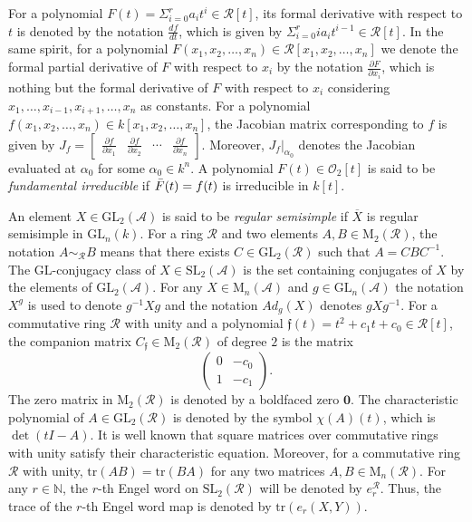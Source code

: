 \documentclass[10pt,twoside]{amsart}
\newcommand{\GL}{\mathrm{GL}}
\newcommand{\SL}{\mathrm{SL}}
\newcommand{\tr}{\mathrm{tr}}
\newcommand{\M}{\mathrm{M}}
\newcommand{\R}{\mathcal{O}_2}
\theoremstyle{definition}
\theoremstyle{definition}
\begin{document}
For a polynomial $F(t) = \Sigma_{i=0}^r a_i t^i\in \mathcal R[t]$, its formal derivative with respect to $t$ is denoted by the notation $\frac{df}{dt}$, which is given by $\Sigma_{i=0}^r ia_i t^{i-1}\in \mathcal R[t]$. In the same spirit, for a polynomial $F(x_1,x_2,\ldots, x_n)\in \mathcal R[x_1,x_2,\ldots,x_n]$ we denote the formal partial derivative of $F$ with respect to $x_i$ by the notation $\frac{\partial F}{\partial x_i}$, which is nothing but the formal derivative of $F$ with respect to $x_i$ considering $x_1,\ldots, x_{i-1}, x_{i+1},\ldots, x_n$ as constants. For a polynomial $f(x_1,x_2,\ldots, x_n)\in k[x_1,x_2,\ldots, x_n]$, the Jacobian matrix corresponding to $f$ is given by $J_f = \left[\begin{array}{cccccccc}
\frac{\partial f}{\partial x_1} & \frac{\partial f}{\partial x_2} & \cdots & \frac{\partial f}{\partial x_n} 
\end{array}\right]$. Moreover, $J_f|_{\alpha_0}$
 denotes the Jacobian evaluated at $\alpha_0$ for some $\alpha_0\in k^n$. A polynomial $F(t)\in \R[t]$ is said to be \emph{fundamental irreducible} if $\Bar{F}(t) = f(t)$ is irreducible in $k[t]$. 

An element $X\in \GL_2(\mathcal{A})$ is said to be \emph{regular semisimple} if $\overline{X}$ is regular semisimple in $\GL_n(k)$. For a ring $\mathcal R$ and two elements $A, B \in \M_2(\mathcal R)$, the notation $A \sim_{\mathcal R} B$ means that there exists $C\in \GL_2(\mathcal R)$ such that $A = CBC^{-1}$. The $\GL$-conjugacy class of $X\in \SL_2(\mathcal{A})$ is the set containing conjugates of $X$ by the elements of $\GL_2(\mathcal{A})$. For any $X\in \M_n(\mathcal{A})$ and $g\in \GL_n(\mathcal{A})$ the notation $X^g$ is used to denote $g^{-1}Xg$ and the notation $Ad_g(X)$ denotes $gXg^{-1}$. 
For a commutative ring $\mathcal R$ with unity and a polynomial $\mathfrak f(t)=t^2+ c_1t+c_0\in \mathcal R[t]$, the companion matrix $C_{\mathfrak f}\in\M_2(\mathcal R)$ of degree $2$ is the matrix 
$$\begin{pmatrix} 0 & -c_0 \\ 1 &  -c_1 \end{pmatrix}.$$
The zero matrix in $\M_2(\mathcal R)$ is denoted by a boldfaced zero $\mathbf 0$. The characteristic polynomial of $A \in \GL_2(\mathcal R)$ is denoted by the symbol $\chi(A)(t)$, which is $\det(tI-A)$. It is well known that square matrices over commutative rings with unity satisfy their characteristic equation. Moreover, for a commutative ring $\mathcal{R}$ with unity, $\tr(AB)= \tr(BA)$ for any two matrices $A, B\in \M_n(\mathcal{R})$. For any $r\in \mathbb{N}$, the $r$-th Engel word on $\SL_2(\mathcal{R})$ will be denoted by $e_r^{\mathcal{R}}$. Thus, the trace of the $r$-th Engel word map is denoted by $\tr(e_r(X, Y))$. 
\end{document}

